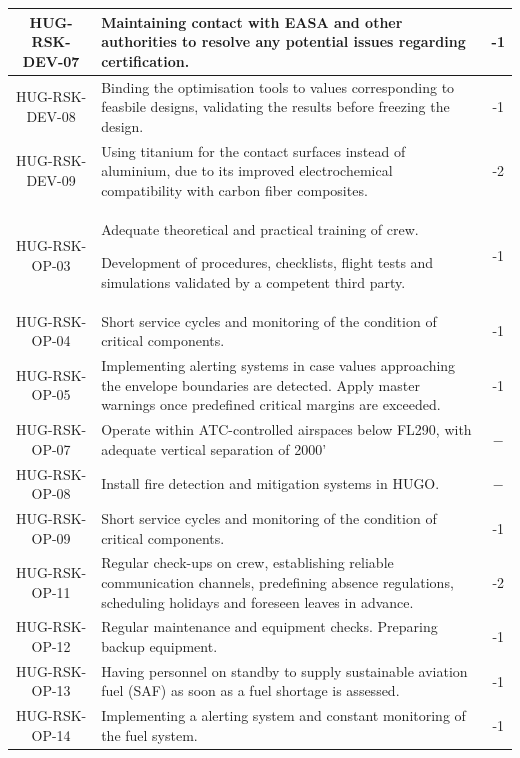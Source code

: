 \begin{longtable}{|c|p{12cm}|c|}
HUG-RSK-DEV-07 & Maintaining contact with EASA and other authorities to resolve any potential issues regarding certification.
& -1 \\ \hline

HUG-RSK-DEV-08 & Binding the optimisation tools to values corresponding to feasbile designs, validating the results before freezing the design. & -1 \\\hline

HUG-RSK-DEV-09 & Using titanium for the contact surfaces instead of aluminium, due to its improved electrochemical compatibility with carbon fiber composites. & -2 \\\hline

HUG-RSK-OP-03 & Adequate theoretical and practical training of crew.
         
         Development of procedures, checklists, flight tests and simulations validated by a competent third party. & -1 \\ \hline
         HUG-RSK-OP-04 & Short service cycles and monitoring of the condition of critical components. & -1 \\ \hline
         HUG-RSK-OP-05 & Implementing alerting systems in case values approaching the envelope boundaries are detected. Apply master warnings once predefined critical margins are exceeded. & -1 \\ \hline
         HUG-RSK-OP-07 & Operate within ATC-controlled airspaces below FL290, with adequate vertical separation of 2000' & $-$ \\ \hline 
         HUG-RSK-OP-08 & Install fire detection and mitigation systems in HUGO. & $-$ \\\hline
         HUG-RSK-OP-09 & Short service cycles and monitoring of the condition of critical components. & -1 \\ \hline
         
HUG-RSK-OP-11 & Regular check-ups on crew, establishing reliable communication channels, predefining absence regulations, scheduling holidays and foreseen leaves in advance.
& -2 \\ \hline

HUG-RSK-OP-12 & Regular maintenance and equipment checks. Preparing backup equipment.
& -1 \\ \hline

HUG-RSK-OP-13 & Having personnel on standby to supply sustainable aviation fuel (SAF) as soon as a fuel shortage is assessed.
& -1 \\ \hline

HUG-RSK-OP-14 & Implementing a alerting system and constant monitoring of the fuel system.
& -1 \\ \hline


\end{longtable}
